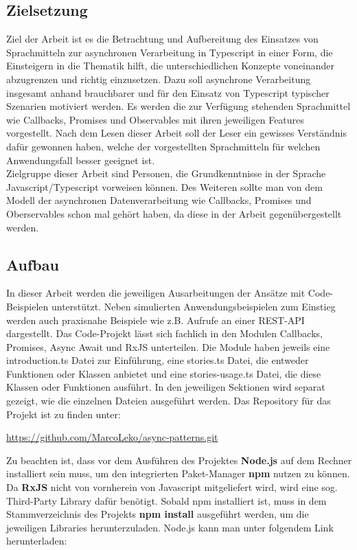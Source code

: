 \subsection{Zielsetzung}

Ziel der Arbeit ist es die Betrachtung und Aufbereitung des Einsatzes von Sprachmitteln zur asynchronen Verarbeitung in Typescript in einer Form, die Einsteigern in die Thematik hilft, die unterschiedlichen Konzepte voneinander abzugrenzen und richtig einzusetzen. Dazu soll asynchrone Verarbeitung insgesamt anhand brauchbarer und für den Einsatz von Typescript typischer Szenarien motiviert werden. Es werden die zur Verfügung stehenden Sprachmittel wie Callbacks, Promises und Observables mit ihren jeweiligen Features vorgestellt. Nach dem Lesen dieser Arbeit soll der Leser ein gewisses Verständnis dafür gewonnen haben, welche der vorgestellten Sprachmitteln für welchen Anwendungsfall besser geeignet ist.\\

\noindent
Zielgruppe dieser Arbeit sind Personen, die Grundkenntnisse in der Sprache Javascript/Typescript vorweisen können. Des Weiteren sollte man von dem Modell der asynchronen Datenverarbeitung wie Callbacks, Promises und Oberservables schon mal gehört haben, da diese in der Arbeit gegenübergestellt werden.

\subsection{Aufbau}

In dieser Arbeit werden die jeweiligen Ausarbeitungen der Ansätze mit Code-Beispielen unterstützt. Neben simulierten Anwendungsbeispielen zum Einstieg werden auch praxisnahe Beispiele wie z.B. Aufrufe an einer REST-API dargestellt. Das Code-Projekt lässt sich fachlich in den Modulen Callbacks, Promises, Async Await und RxJS unterteilen. Die Module haben jeweils eine introduction.ts Datei zur Einführung, eine stories.ts Datei, die entweder Funktionen oder Klassen anbietet und eine stories-usage.ts Datei, die diese Klassen oder Funktionen ausführt. In den jeweiligen Sektionen wird separat gezeigt, wie die einzelnen Dateien ausgeführt werden. Das Repository für das Projekt ist zu finden unter: 

\begin{center}
\url{https://github.com/MarcoLeko/async-patterns.git}
\end{center}

\noindent
Zu beachten ist, dass vor dem Ausführen des Projektes \textbf{Node.js} auf dem Rechner installiert sein muss, um den integrierten Paket-Manager \textbf{npm} nutzen zu können. Da \textbf{RxJS} nicht von vornherein von Javascript mitgeliefert wird, wird eine sog. \glqq Third-Party Library\grqq{} dafür benötigt. Sobald npm installiert ist, muss in dem Stammverzeichnis des Projekts \textbf{npm install} ausgeführt werden, um die jeweiligen Libraries herunterzuladen. Node.js kann man unter folgendem Link herunterladen:

